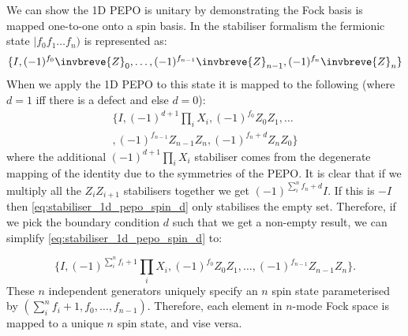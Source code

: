 \documentclass[aps,prx,twocolumn,floatfix,10pt,amssymb,amsfont,amsmath,superscriptaddress,float,nofootinbib,longbibliography,nobalancelastpage]{revtex4-2}
\begin{document}

We can show the 1D PEPO is unitary by demonstrating the Fock basis is mapped one-to-one onto a spin basis. In the stabiliser formalism the fermionic state $  |f_0f_1\ldots f_n)$ is represented as:
\begin{equation}
    \{I, (-1)^{f_0} \invbreve{Z}_0, \ldots, (-1)^{f_{n-1}}\invbreve{Z}_{n-1}, (-1)^{f_n}\invbreve{Z}_{n}\}
\end{equation}
When we apply the 1D PEPO to this state it is mapped to the following (where $d=1$ iff there is a defect and else $d=0$):
\begin{multline}
    \{I, (-1)^{d+1}\prod_i X_i, (-1)^{f_0} Z_0Z_1, \ldots\\, (-1)^{f_{n-1}}Z_{n-1}Z_{n}, (-1)^{f_n+d}Z_{n}Z_0\}
    \label{eq:stabiliser_1d_pepo_spin_d}
\end{multline}
where the additional $(-1)^{d+1}\prod_i X_i$ stabiliser comes from the degenerate mapping of the identity due to the symmetries of the PEPO. It is clear that if we multiply all the $Z_{i}Z_{i+1}$ stabilisers together we get $(-1)^{\sum_i^n f_n + d}I$. If this is $-I$ then \eqref{eq:stabiliser_1d_pepo_spin_d} only stabilises the empty set. Therefore, if we pick the boundary condition $d$ such that we get a non-empty result, we can simplify \eqref{eq:stabiliser_1d_pepo_spin_d} to:

\begin{equation}
    \{I, (-1)^{\sum_{i}^{n}f_i+1}\prod_i X_i, (-1)^{f_0} Z_0Z_1, \ldots, (-1)^{f_{n-1}}Z_{n-1}Z_{n}\}.
    \label{eq:stabiliser_1d_pepo_spin}
\end{equation}
These $n$ independent generators uniquely specify an $n$ spin state parameterised by $(\sum_{i}^{n}f_i+1, f_0,\ldots, f_{n-1})$. Therefore, each element in $n$-mode Fock space is mapped to a unique $n$ spin state, and vise versa.
\end{document}
